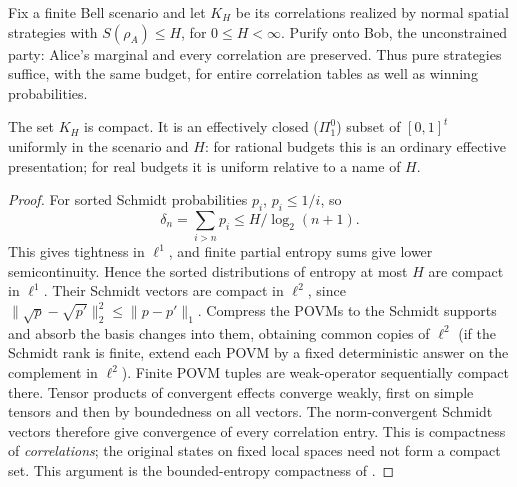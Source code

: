 Fix a finite Bell scenario and let $K_H$ be its correlations realized by
normal spatial strategies with $S(\rho_A)\le H$, for $0\le H<\infty$.
Purify onto Bob, the unconstrained party: Alice's marginal and every
correlation are preserved. Thus pure strategies suffice, with the same
budget, for entire correlation tables as well as winning probabilities.

\begin{proposition}\label{prop:entropycompact}
The set $K_H$ is compact. It is an effectively closed ($\Pi^0_1$) subset of $[0,1]^t$ uniformly in the scenario
and $H$: for rational budgets this is an ordinary effective presentation;
for real budgets it is uniform relative to a name of $H$.
\end{proposition}
\begin{proof}
For sorted Schmidt probabilities $p_i$, $p_i\le1/i$, so
\begin{equation}\label{eq:entropytail}
 \delta_n=\sum_{i>n}p_i\le H/\log_2(n+1).
\end{equation}
This gives tightness in $\ell^1$, and finite partial entropy sums give
lower semicontinuity. Hence the sorted distributions of entropy at most
$H$ are compact in $\ell^1$. Their Schmidt vectors are compact in $\ell^2$,
since $\|\sqrt p-\sqrt{p'}\|_2^2\le\|p-p'\|_1$.
Compress the POVMs to the Schmidt supports and absorb the basis changes
into them, obtaining common copies of $\ell^2$ (if the Schmidt rank is finite, extend each POVM by a fixed deterministic answer on the complement in $\ell^2$). Finite POVM tuples are
weak-operator sequentially compact there. Tensor products of convergent
effects converge weakly, first on simple tensors and then by boundedness
on all vectors. The norm-convergent Schmidt vectors therefore give
convergence of every correlation entry. This is compactness of
\emph{correlations}; the original states on fixed local spaces need not
form a compact set. This argument is the bounded-entropy compactness
of \cite[Section~9.1, ``Divergence at bounded entropy'']{Entropy}.


\end{proof}
